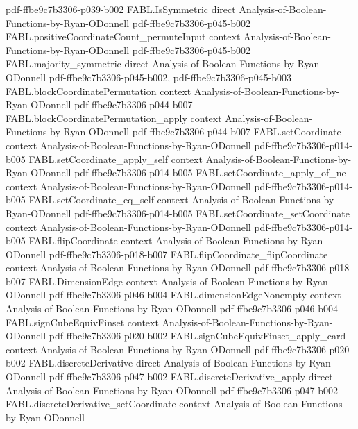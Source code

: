 \begin{theorem}
  {pdf-ffbe9c7b3306-p039-b002}
\proofstep
  {FABL.IsSymmetric}
  {direct}
  {Analysis-of-Boolean-Functions-by-Ryan-ODonnell}
  {pdf-ffbe9c7b3306-p045-b002}
\proofstep
  {FABL.positiveCoordinateCount_permuteInput}
  {context}
  {Analysis-of-Boolean-Functions-by-Ryan-ODonnell}
  {pdf-ffbe9c7b3306-p045-b002}
\proofstep
  {FABL.majority_symmetric}
  {direct}
  {Analysis-of-Boolean-Functions-by-Ryan-ODonnell}
  {pdf-ffbe9c7b3306-p045-b002,
    pdf-ffbe9c7b3306-p045-b003}
\proofstep
  {FABL.blockCoordinatePermutation}
  {context}
  {Analysis-of-Boolean-Functions-by-Ryan-ODonnell}
  {pdf-ffbe9c7b3306-p044-b007}
\proofstep
  {FABL.blockCoordinatePermutation_apply}
  {context}
  {Analysis-of-Boolean-Functions-by-Ryan-ODonnell}
  {pdf-ffbe9c7b3306-p044-b007}
\proofstep
  {FABL.setCoordinate}
  {context}
  {Analysis-of-Boolean-Functions-by-Ryan-ODonnell}
  {pdf-ffbe9c7b3306-p014-b005}
\proofstep
  {FABL.setCoordinate_apply_self}
  {context}
  {Analysis-of-Boolean-Functions-by-Ryan-ODonnell}
  {pdf-ffbe9c7b3306-p014-b005}
\proofstep
  {FABL.setCoordinate_apply_of_ne}
  {context}
  {Analysis-of-Boolean-Functions-by-Ryan-ODonnell}
  {pdf-ffbe9c7b3306-p014-b005}
\proofstep
  {FABL.setCoordinate_eq_self}
  {context}
  {Analysis-of-Boolean-Functions-by-Ryan-ODonnell}
  {pdf-ffbe9c7b3306-p014-b005}
\proofstep
  {FABL.setCoordinate_setCoordinate}
  {context}
  {Analysis-of-Boolean-Functions-by-Ryan-ODonnell}
  {pdf-ffbe9c7b3306-p014-b005}
\proofstep
  {FABL.flipCoordinate}
  {context}
  {Analysis-of-Boolean-Functions-by-Ryan-ODonnell}
  {pdf-ffbe9c7b3306-p018-b007}
\proofstep
  {FABL.flipCoordinate_flipCoordinate}
  {context}
  {Analysis-of-Boolean-Functions-by-Ryan-ODonnell}
  {pdf-ffbe9c7b3306-p018-b007}
\proofstep
  {FABL.DimensionEdge}
  {context}
  {Analysis-of-Boolean-Functions-by-Ryan-ODonnell}
  {pdf-ffbe9c7b3306-p046-b004}
\proofstep
  {FABL.dimensionEdgeNonempty}
  {context}
  {Analysis-of-Boolean-Functions-by-Ryan-ODonnell}
  {pdf-ffbe9c7b3306-p046-b004}
\proofstep
  {FABL.signCubeEquivFinset}
  {context}
  {Analysis-of-Boolean-Functions-by-Ryan-ODonnell}
  {pdf-ffbe9c7b3306-p020-b002}
\proofstep
  {FABL.signCubeEquivFinset_apply_card}
  {context}
  {Analysis-of-Boolean-Functions-by-Ryan-ODonnell}
  {pdf-ffbe9c7b3306-p020-b002}
\proofstep
  {FABL.discreteDerivative}
  {direct}
  {Analysis-of-Boolean-Functions-by-Ryan-ODonnell}
  {pdf-ffbe9c7b3306-p047-b002}
\proofstep
  {FABL.discreteDerivative_apply}
  {direct}
  {Analysis-of-Boolean-Functions-by-Ryan-ODonnell}
  {pdf-ffbe9c7b3306-p047-b002}
\proofstep
  {FABL.discreteDerivative_setCoordinate}
  {context}
  {Analysis-of-Boolean-Functions-by-Ryan-ODonnell}

\end{theorem}
